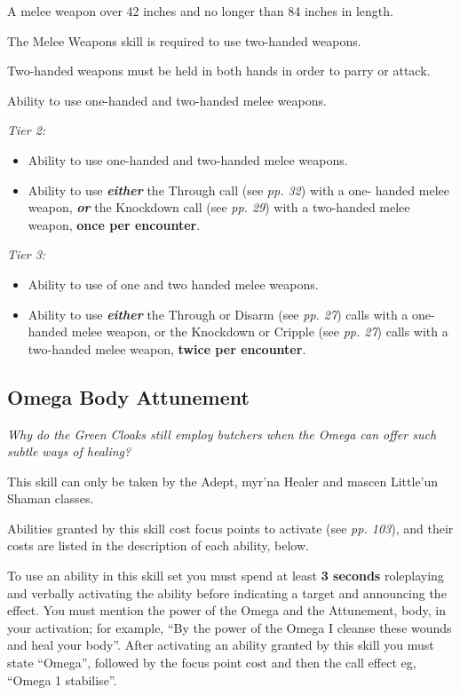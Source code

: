 \documentclass{scrbook}
\begin{document}
A melee weapon over 42 inches and no longer than 84 inches in length.

The Melee Weapons skill is required to use two-handed weapons.

Two-handed weapons must be held in both hands in order to parry or attack.

Ability to use one-handed and two-handed melee weapons.

\textit{Tier 2:}

\begin{itemize}
\item Ability to use one-handed and two-handed melee weapons.

\item Ability to use \textbf{\textit{either}} the Through call (see \textit{pp. 32}) with a one- handed melee weapon, \textbf{\textit{or}} the Knockdown call (see \textit{pp. 29}) with a two-handed melee weapon, \textbf{once per encounter}.

\end{itemize}
\textit{Tier 3:}

\begin{itemize}
\item Ability to use of one and two handed melee weapons.

\item Ability to use \textbf{\textit{either}} the Through or Disarm (see \textit{pp. 27}) calls with a one-handed melee weapon, or the Knockdown or Cripple (see \textit{pp. 27}) calls with a two-handed melee weapon, \textbf{twice per encounter}.

\end{itemize}
\subsection{Omega Body Attunement}

\textit{Why do the Green Cloaks still employ butchers when the Omega can offer such subtle ways of healing?}

This skill can only be taken by the Adept, myr'na Healer and mascen Little'un Shaman classes.

Abilities granted by this skill cost focus points to activate (see \textit{pp. 103}), and their costs are listed in the description of each ability, below.

To use an ability in this skill set you must spend at least \textbf{3 seconds} roleplaying and verbally activating the ability before indicating a target and announcing the effect. You must mention the power of the Omega and the Attunement, body, in your activation; for example, ``By the power of the Omega I cleanse these wounds and heal your body''. After activating an ability granted by this skill you must state ``Omega'', followed by the focus point cost and then the call effect eg, ``Omega 1 stabilise''.
\end{document}

